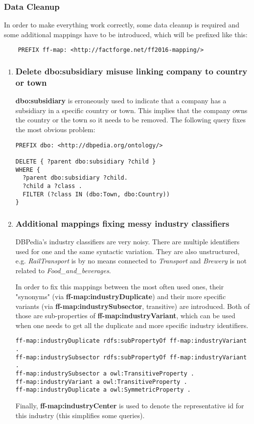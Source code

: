 \subsubsection{Data Cleanup}
In order to make everything work correctly, some data cleanup is required and some additional mappings have to be introduced, which will be prefixed like this:
\begin{verbatim}
    PREFIX ff-map: <http://factforge.net/ff2016-mapping/>
\end{verbatim}
\begin{enumerate}
    \item \subsubsection {Delete dbo:subsidiary misuse linking company to country or town}
    
    \textbf{dbo:subsidiary} is erroneously used to indicate that a company has a subsidiary in a specific country or town. This implies that the company owns the country or the town so it needs to be removed. The following query fixes the most obvious problem:
    
\begin{verbatim}
PREFIX dbo: <http://dbpedia.org/ontology/>

DELETE { ?parent dbo:subsidiary ?child }
WHERE {
  ?parent dbo:subsidiary ?child.
  ?child a ?class .
  FILTER (?class IN (dbo:Town, dbo:Country))
}
\end{verbatim}

    \item \subsubsection{Additional mappings fixing messy industry classifiers}
    DBPedia's industry classifiers are very noisy. There are multiple identifiers used for one and the same syntactic variation. They are also unstructured, e.g. \textit{RailTransport} is by no means connected to \textit{Transport} and \textit{Brewery} is not related to \textit{Food\_and\_beverages}.
    
    In order to fix this mappings between the most often used ones, their "synonyms" (via \textbf{ff-map:industryDuplicate}) and their more specific variants (via \textbf{ff-map:industrySubsector}, transitive) are introduced. Both of those are sub-properties of \textbf{ff-map:industryVariant}, which can be used when one needs to get all the duplicate and more specific industry identifiers.
\begin{verbatim}
ff-map:industryDuplicate rdfs:subPropertyOf ff-map:industryVariant .
ff-map:industrySubsector rdfs:subPropertyOf ff-map:industryVariant .
ff-map:industrySubsector a owl:TransitiveProperty .
ff-map:industryVariant a owl:TransitiveProperty .
ff-map:industryDuplicate a owl:SymmetricProperty .
\end{verbatim}
    Finally, \textbf{ff-map:industryCenter} is used to denote the representative id for this industry (this simplifies some queries).
    

\end{enumerate}
